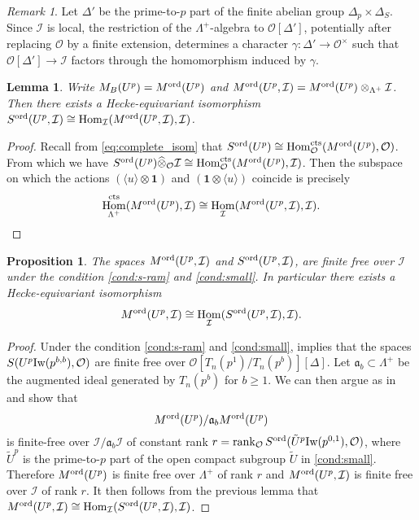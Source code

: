 \documentclass[leqno]{amsart}
\newtheorem{lem}[thm]{Lemma}
\newtheorem{prop}[thm]{Proposition}
\theoremstyle{definition}
\theoremstyle{remark}
\newtheorem{rem}[thm]{Remark}
\newcommand{\id}{\mathbf{1}}
\newcommand{\oo}{\mathcal{O}}
\DeclareMathOperator{\Hom}{Hom}
\newcommand{\cts}{\textnormal{cts}}
\newcommand{\fa}{\mathfrak{a}}
\newcommand{\Iw}{\textnormal{Iw}} %
\newcommand{\I}{\mathcal{I}} %
\newcommand{\ord}{\textnormal{ord}} %
\begin{document}
\begin{rem}
Let $\Delta'$ be the prime-to-$p$ part of the 
finite abelian group $\Delta_p\times \Delta_S$.
Since $\I$ is local,
the restriction of the $\Lambda^+$-algebra to $\oo[\Delta']$,
potentially after replacing $\oo$ by a finite extension,
determines a character 
$\gamma\colon\Delta'\to \oo^\times$
such that $\oo[\Delta']\to \I$
factors through the homomorphism induced by $\gamma$.

\end{rem}

\begin{lem}
    Write $M_B(U^p)=M^{\ord}(U^p)$
    and $M^{\ord}(U^p,\I)=M^{\ord}(U^p)\otimes_{\Lambda^+}\I$.
    Then there exists a Hecke-equivariant isomorphism
    $S^{\ord}(U^p,\I)\cong\Hom_\I(M^{\ord}(U^p,\I), \I)$.
\end{lem}
\begin{proof}
Recall from \eqref{eq:complete_isom} that
$S^{\ord}(U^p)\cong \Hom^{\cts}_\oo(M^{\ord}(U^p),\oo)$.
From which we have
$S^{\ord}(U^p)\widehat{\otimes}_\oo\I
\cong \Hom^{\cts}_\oo(M^{\ord}(U^p),\I)$.
Then the subspace on which the actions
$(\langle u\rangle\otimes\id)$ and
$(\id\otimes\langle u\rangle)$
coincide is precisely
\[
    \Hom^{\cts}_{\Lambda^+}(M^{\ord}(U^p),\I)\cong
    \Hom_{\I}(M^{\ord}(U^p,\I),\I).
\]
\end{proof}

\begin{prop} \label{prop:ord_to_dual}
The spaces $M^{\ord}(U^p,\I)$ and
$S^{\ord}(U^p,\I)$,
are finite free over $\I$
under the condition \eqref{cond:s-ram} and \eqref{cond:small}.
In particular there exists a Hecke-equivariant isomorphism
\[
    M^{\ord}(U^p,\I)\cong \Hom_\I(S^{\ord}(U^p,\I),\I).
\]
\end{prop}

\begin{proof}
Under the condition \eqref{cond:s-ram} and \eqref{cond:small},
\cite[Lem 2.6]{ger} implies that the spaces 
$S(U^p\Iw(p^{b,b}),\oo)$ are finite free over 
$\oo[T_n(p^1)/T_n(p^b)][\Delta]$.
Let $\fa_b\subset\Lambda^+$
be the augmented ideal generated by $T_n(p^b)$ for $b\geq1$.
We can then argue as in \cite[Prop 2.20]{ger} and show that
\[
    M^{\ord}(U^p)/\fa_b M^{\ord}(U^p)
\]
is finite-free over $\I/\fa_b\I$
of constant rank
$r=\operatorname{rank}_\oo S^{\ord}(\tilde{U}^p\Iw(p^{0,1}),\oo)$,
where $\tilde{U}^p$ is the prime-to-$p$ part
of the open compact subgroup $\tilde{U}$ in \eqref{cond:small}.
Therefore $M^{\ord}(U^p)$ is finite free over $\Lambda^+$
of rank $r$ and 
$M^{\ord}(U^p,\I)$ is finite free over $\I$ of rank $r$.
It then follows from the previous lemma that 
$M^{\ord}(U^p,\I)\cong \Hom_\I(S^{\ord}(U^p,\I),\I)$.

\end{proof}
\end{document}
